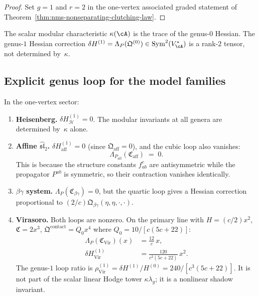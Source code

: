 \begin{proof}
Set $g=1$ and $r=2$ in the one-vertex associated graded statement of
Theorem~\ref{thm:nms-nonseparating-clutching-law}.\qedhere
\end{proof}

\begin{remark}
\label{rem:nms-beyond-ahat}
The scalar modular characteristic $\kappa(\cA)$ is the trace of the genus-$0$ Hessian. The genus-$1$ Hessian correction $\delta H^{(1)}=\Lambda_P(\mathfrak Q^{(0)}) \in \operatorname{Sym}^2(V_{\cA}^*)$ is a rank-$2$ tensor, not determined by~$\kappa$.
\end{remark}

\subsection{Explicit genus loop for the model families}
\label{subsec:nms-explicit-genus-loop}

\begin{theorem}
\label{thm:nms-genus-loop-model-families}
In the one-vertex sector:
\begin{enumerate}[label=\textup{(\roman*)}]
\item \textbf{Heisenberg.}
$\delta H^{(1)}_{\mathcal H}=0$.
The modular invariants at all genera are determined by~$\kappa$ alone.

\item \textbf{Affine $\widehat{\mathfrak{sl}}_2$.}
$\delta H^{(1)}_{\mathrm{aff}}=0$ (since $\mathfrak Q_{\mathrm{aff}}=0$), and the cubic loop also vanishes:
\begin{equation}
\label{eq:nms-affine-cubic-loop}
\Lambda_{P_{\mathrm{aff}}}(\mathfrak C_{\mathrm{aff}}) \;=\; 0.
\end{equation}
This is because the structure constants $f^c_{ab}$ are
antisymmetric while the propagator $P^{ab}$ is symmetric,
so their contraction vanishes identically.

\item \textbf{$\beta\gamma$ system.}
$\Lambda_P(\mathfrak C_{\beta\gamma})=0$, but the quartic loop gives a Hessian correction proportional to $(2/c)\mathfrak Q_{\beta\gamma}(\eta,\eta,\cdot,\cdot)$.

\item \textbf{Virasoro.}
Both loops are nonzero. On the primary line with $H=(c/2)x^2$, $\mathfrak C=2x^3$, $\mathfrak Q^{\mathrm{contact}}=Q_0 x^4$ where $Q_0=10/[c(5c+22)]$:
\begin{align}
\Lambda_P(\mathfrak C_{\mathrm{Vir}})(x)
&=
\frac{12}{c}\,x,
\label{eq:nms-virasoro-cubic-loop}
\\
\delta H^{(1)}_{\mathrm{Vir}}
&=
\frac{120}{c^2(5c+22)}\,x^2.
\label{eq:nms-virasoro-hessian-correction}
\end{align}
The genus-$1$ loop ratio is
$\rho^{(1)}_{\mathrm{Vir}}=\delta H^{(1)}/H^{(0)}=240/[c^3(5c+22)]$.
It is not part of the scalar linear Hodge tower
$\kappa\lambda_g$; it is a nonlinear shadow invariant.
\end{enumerate}
\end{theorem}

